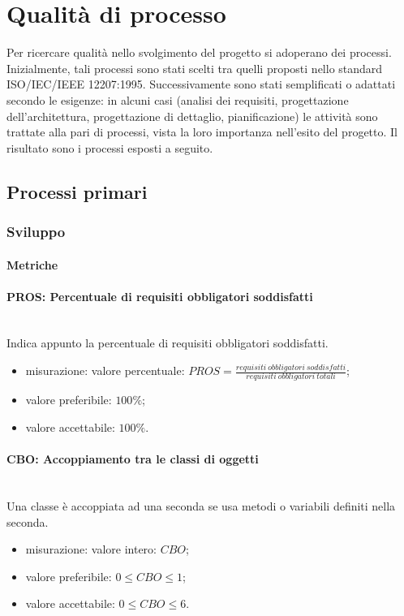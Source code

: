 \section{Qualità di processo}
Per ricercare qualità nello svolgimento del progetto si adoperano dei processi. Inizialmente, tali processi sono stati scelti tra quelli proposti nello standard ISO/IEC/IEEE 12207:1995. Successivamente sono stati semplificati o adattati secondo le esigenze: in alcuni casi (analisi dei requisiti, progettazione dell'architettura, progettazione di dettaglio, pianificazione) le attività sono trattate alla pari di processi, vista la loro importanza nell'esito del progetto.\newline 
Il risultato sono i processi esposti a seguito.

	\subsection{Processi primari}
	\subsubsection{Sviluppo}
		\paragraph{Metriche}
			\paragraph*{PROS: Percentuale di requisiti obbligatori soddisfatti}\mbox{}\\
			Indica appunto la percentuale di requisiti obbligatori soddisfatti.
			\begin{itemize}
				\item misurazione: valore percentuale: $ PROS = \frac{requisiti\ obbligatori\ soddisfatti}{requisiti\ obbligatori\ totali}$;
				\item valore preferibile: $100\%$;
				\item valore accettabile: $100\%$.
			\end{itemize}
			\paragraph*{CBO: Accoppiamento tra le classi di oggetti} \mbox{}\\
			Una classe è accoppiata ad una seconda se usa metodi o variabili definiti nella seconda. 
			\begin{itemize}
				\item misurazione: valore intero: $CBO$;
				\item valore preferibile: $0 \leq CBO \leq 1$;
				\item valore accettabile: $0 \leq CBO \leq 6$.
			\end{itemize}
		
